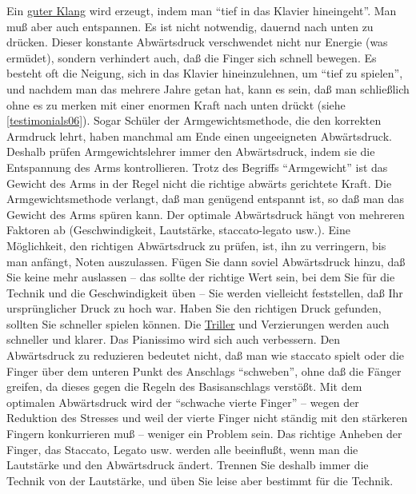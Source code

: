 Ein \hyperref[c1iii1a]{guter Klang} wird erzeugt, indem man \enquote{tief in das Klavier hineingeht}.
Man muß aber auch entspannen.
Es ist nicht notwendig, dauernd nach unten zu drücken.
Dieser konstante Abwärtsdruck verschwendet nicht nur Energie (was ermüdet), sondern verhindert auch, daß die Finger sich schnell bewegen.
Es besteht oft die Neigung, sich in das Klavier hineinzulehnen, um \enquote{tief zu spielen}, und nachdem man das mehrere Jahre getan hat, kann es sein, daß man schließlich ohne es zu merken mit einer enormen Kraft nach unten drückt (siehe \hyperref[testimonials06]{\autoref{testimonials06}}).
Sogar Schüler der Armgewichtsmethode, die den korrekten Armdruck lehrt, haben manchmal am Ende einen ungeeigneten Abwärtsdruck.
Deshalb prüfen Armgewichtslehrer immer den Abwärtsdruck, indem sie die Entspannung des Arms kontrollieren.
Trotz des Begriffs \enquote{Armgewicht} ist das Gewicht des Arms in der Regel nicht die richtige abwärts gerichtete Kraft.
Die Armgewichtsmethode verlangt, daß man genügend entspannt ist, so daß man das Gewicht des Arms spüren kann.
Der optimale Abwärtsdruck hängt von mehreren Faktoren ab (Geschwindigkeit, Lautstärke, staccato-legato usw.).
Eine Möglichkeit, den richtigen Abwärtsdruck zu prüfen, ist, ihn zu verringern, bis man anfängt, Noten auszulassen.
Fügen Sie dann soviel Abwärtsdruck hinzu, daß Sie keine mehr auslassen -- das sollte der richtige Wert sein, bei dem Sie für die Technik und die Geschwindigkeit üben -- Sie werden vielleicht feststellen, daß Ihr ursprünglicher Druck zu hoch war.
Haben Sie den richtigen Druck gefunden, sollten Sie schneller spielen können.
Die \hyperref[c1iii3]{Triller} und Verzierungen werden auch schneller und klarer.
Das Pianissimo wird sich auch verbessern.
Den Abwärtsdruck zu reduzieren bedeutet nicht, daß man wie staccato spielt oder die Finger über dem unteren Punkt des Anschlags \enquote{schweben}, ohne daß die Fänger greifen, da dieses gegen die Regeln des Basisanschlags verstößt.
Mit dem optimalen Abwärtsdruck wird der \enquote{schwache vierte Finger} -- wegen der Reduktion des Stresses und weil der vierte Finger nicht ständig mit den stärkeren Fingern konkurrieren muß -- weniger ein Problem sein.
Das richtige Anheben der Finger, das Staccato, Legato usw. werden alle beeinflußt, wenn man die Lautstärke und den Abwärtsdruck ändert.
Trennen Sie deshalb immer die Technik von der Lautstärke, und üben Sie leise aber bestimmt für die Technik.

